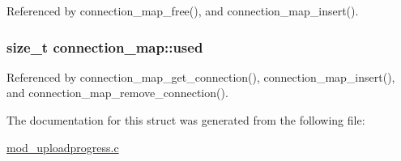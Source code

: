Referenced by connection\-\_\-map\-\_\-free(), and connection\-\_\-map\-\_\-insert().

\hypertarget{structconnection__map_a2134cc87d079932ee2892870c6369a11}{
\subsubsection[{used}]{\setlength{\rightskip}{0pt plus 5cm}size\-\_\-t connection\-\_\-map\-::used}}\label{structconnection__map_a2134cc87d079932ee2892870c6369a11}


Referenced by connection\-\_\-map\-\_\-get\-\_\-connection(), connection\-\_\-map\-\_\-insert(), and connection\-\_\-map\-\_\-remove\-\_\-connection().



The documentation for this struct was generated from the following file\-:\begin{DoxyCompactItemize}
\item 
\hyperlink{mod__uploadprogress_8c}{mod\-\_\-uploadprogress.\-c}\end{DoxyCompactItemize}
